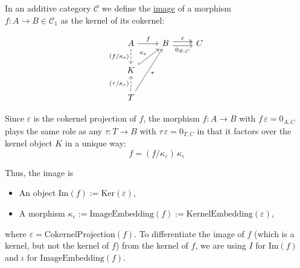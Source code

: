 \begin{definition}[Image]
In an additive category $\mathcal{C}$ we define the \ul{image} of a morphism\\
$f : A \rightarrow B \in \mathcal{C}_{1}$ as the kernel of its cokernel:\\
\begin{minipage}{.06\textwidth} \phantom{} \end{minipage}
\begin{minipage}{.39\textwidth}
\[
\begin{tikzcd}[
  ampersand replacement=\&,
]
A \arrow[r, "f"] \arrow[d, "(f/\kappa_{\varepsilon})"', dashed]         \& B \arrow[r, "\varepsilon", shift left, two heads]
\arrow[r, "{0_{B,C}}"', shift right] \& C \\
K \arrow[ru, "\kappa_{\varepsilon}", hook]                                    \&                            \&   \\
T \arrow[u, "(\tau/\kappa_{\varepsilon})", dashed] \arrow[ruu, "\tau"'] \&                            \&  
\end{tikzcd}
\]
\end{minipage}
\begin{minipage}{.49\textwidth}
Since $\varepsilon$ is the cokernel projection of $f$, the morphism $f : A \rightarrow B$ with $f\,\varepsilon = 0_{A,C}$ plays the
same role as any $\tau : T \rightarrow B$ with $\tau\,\varepsilon = 0_{T,C}$ in that it factors over the kernel object $K$ in a
unique way: 
\[
f = (f/\kappa_{\varepsilon})\,\kappa_{\varepsilon}
\]
\end{minipage}
\begin{minipage}{.06\textwidth} \phantom{} \end{minipage}

Thus, the image is
\begin{itemize}
\item An object $\mathrm{Im}(f) := \mathrm{Ker}(\varepsilon)$,
\item A morphism $\kappa_{\varepsilon} := \mathrm{ImageEmbedding}(f) := \mathrm{KernelEmbedding}(\varepsilon)$,
\end{itemize}
where $\varepsilon = \mathrm{CokernelProjection}(f)$.
To differentiate the image of $f$ (which is a kernel, but not the kernel of $f$) from the kernel of $f$,
we are using $I$ for $\mathrm{Im}(f)$ and $\iota$ for $\mathrm{ImageEmbedding}(f)$.
\end{definition}

